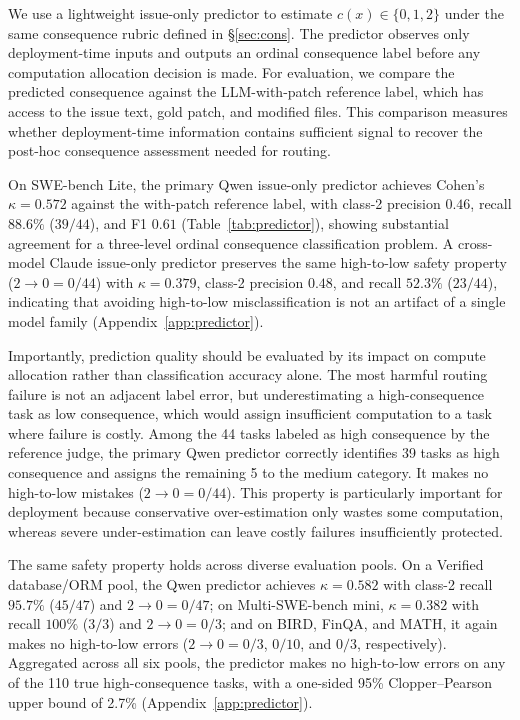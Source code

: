\documentclass{article}
\begin{document}
We use a lightweight issue-only predictor to estimate $\hat{c}(x)\in\{0,1,2\}$ under the same consequence rubric defined in \S\ref{sec:cons}. The predictor observes only deployment-time inputs and outputs an ordinal consequence label before any computation allocation decision is made. For evaluation, we compare the predicted consequence against the LLM-with-patch reference label, which has access to the issue text, gold patch, and modified files. This comparison measures whether deployment-time information contains sufficient signal to recover the post-hoc consequence assessment needed for routing.

On SWE-bench Lite, the primary Qwen issue-only predictor achieves Cohen's $\kappa=0.572$ against the with-patch reference label, with class-2 precision $0.46$, recall $88.6\%$ ($39/44$), and F1 $0.61$ (Table~\ref{tab:predictor}), showing substantial agreement for a three-level ordinal consequence classification problem. A cross-model Claude issue-only predictor preserves the same high-to-low safety property ($2\rightarrow0=0/44$) with $\kappa=0.379$, class-2 precision $0.48$, and recall $52.3\%$ ($23/44$), indicating that avoiding high-to-low misclassification is not an artifact of a single model family (Appendix~\ref{app:predictor}).

Importantly, prediction quality should be evaluated by its impact on compute allocation rather than classification accuracy alone. The most harmful routing failure is not an adjacent label error, but underestimating a high-consequence task as low consequence, which would assign insufficient computation to a task where failure is costly. Among the 44 tasks labeled as high consequence by the reference judge, the primary Qwen predictor correctly identifies 39 tasks as high consequence and assigns the remaining 5 to the medium category. It makes no high-to-low mistakes ($2\rightarrow0=0/44$). This property is particularly important for deployment because conservative over-estimation only wastes some computation, whereas severe under-estimation can leave costly failures insufficiently protected.

The same safety property holds across diverse evaluation pools. On a Verified database/ORM pool, the Qwen predictor achieves $\kappa=0.582$ with class-2 recall $95.7\%$ ($45/47$) and $2\rightarrow0=0/47$; on Multi-SWE-bench mini, $\kappa=0.382$ with recall $100\%$ ($3/3$) and $2\rightarrow0=0/3$; and on BIRD, FinQA, and MATH, it again makes no high-to-low errors ($2\rightarrow0=0/3$, $0/10$, and $0/3$, respectively). Aggregated across all six pools, the predictor makes no high-to-low errors on any of the 110 true high-consequence tasks, with a one-sided 95\% Clopper--Pearson upper bound of 2.7\% (Appendix~\ref{app:predictor}).
\end{document}
